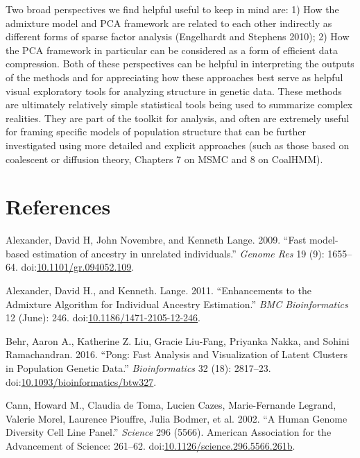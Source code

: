 \documentclass[smallextended]{svjour3}       %
\begin{document}
Two broad perspectives we find helpful useful to keep in mind are: 1)
How the admixture model and PCA framework are related to each other
indirectly as different forms of sparse factor analysis (Engelhardt and
Stephens 2010); 2) How the PCA framework in particular can be considered
as a form of efficient data compression. Both of these perspectives can
be helpful in interpreting the outputs of the methods and for
appreciating how these approaches best serve as helpful visual
exploratory tools for analyzing structure in genetic data. These methods
are ultimately relatively simple statistical tools being used to
summarize complex realities. They are part of the toolkit for analysis,
and often are extremely useful for framing specific models of population
structure that can be further investigated using more detailed and
explicit approaches (such as those based on coalescent or diffusion
theory, Chapters 7 on MSMC and 8 on CoalHMM).

\newpage

\section*{References}\label{references}

\hypertarget{refs}{}
\hypertarget{ref-Alexander09}{}
Alexander, David H, John Novembre, and Kenneth Lange. 2009. ``Fast
model-based estimation of ancestry in unrelated individuals.''
\emph{Genome Res} 19 (9): 1655--64.
doi:\href{https://doi.org/10.1101/gr.094052.109}{10.1101/gr.094052.109}.

\hypertarget{ref-Alexander11}{}
Alexander, David H., and Kenneth. Lange. 2011. ``Enhancements to the
Admixture Algorithm for Individual Ancestry Estimation.'' \emph{BMC
Bioinformatics} 12 (June): 246.
doi:\href{https://doi.org/10.1186/1471-2105-12-246}{10.1186/1471-2105-12-246}.

\hypertarget{ref-Behr16}{}
Behr, Aaron A., Katherine Z. Liu, Gracie Liu-Fang, Priyanka Nakka, and
Sohini Ramachandran. 2016. ``Pong: Fast Analysis and Visualization of
Latent Clusters in Population Genetic Data.'' \emph{Bioinformatics} 32
(18): 2817--23.
doi:\href{https://doi.org/10.1093/bioinformatics/btw327}{10.1093/bioinformatics/btw327}.

\hypertarget{ref-Cann02}{}
Cann, Howard M., Claudia de Toma, Lucien Cazes, Marie-Fernande Legrand,
Valerie Morel, Laurence Piouffre, Julia Bodmer, et al. 2002. ``A Human
Genome Diversity Cell Line Panel.'' \emph{Science} 296 (5566). American
Association for the Advancement of Science: 261--62.
doi:\href{https://doi.org/10.1126/science.296.5566.261b}{10.1126/science.296.5566.261b}.
\end{document}
